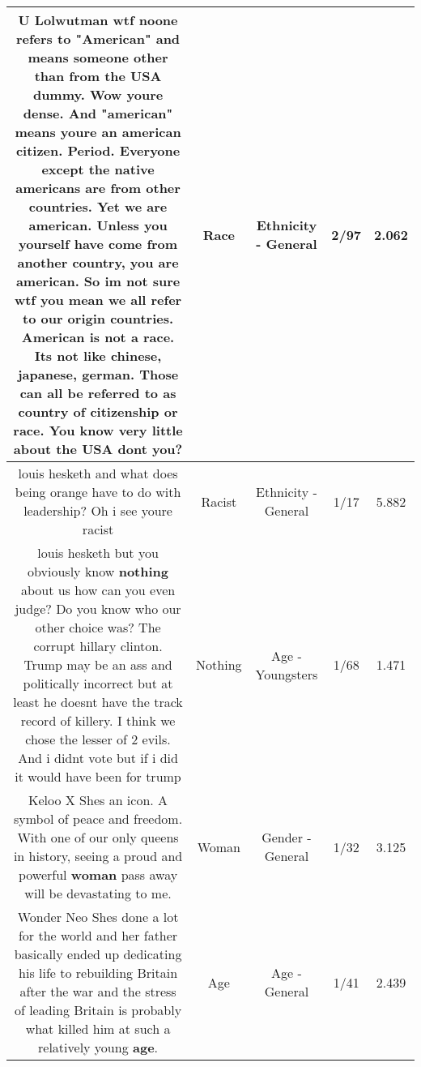 \documentclass[11pt]{article}
\newlength\mylength
\begin{document}
\begin{center}
\begin{longtable}{|C{.65\mylength}|C{.30\mylength}|C{.12\mylength}|C{.12\mylength}|C{.12\mylength}|}
  \small U Lolwutman wtf noone refers to "American" and means someone other than from the USA dummy. Wow youre dense. And "american" means youre an american citizen. Period. Everyone except the native americans are from other countries. Yet we are american. Unless you yourself have come from another country, you are american. So im not sure wtf you mean we all refer to our origin countries. American is not a \textbf{race}. Its not like chinese, japanese, german. Those can all be referred to as country of citizenship or \textbf{race}. You know very little about the USA dont you?\normalsize   & Race & Ethnicity - General & 2/97 & 2.062 \\  \hline
  \small louis hesketh and what does being orange have to do with leadership? Oh i see youre racist\normalsize   & Racist & Ethnicity - General & 1/17 & 5.882 \\  \hline
  \small louis hesketh but you obviously know \textbf{nothing} about us how can you even judge?  Do you know who our other choice was? The corrupt hillary clinton. Trump may be an ass and politically incorrect but at least he doesnt have the track record of killery. I think we chose the lesser of 2 evils. And i didnt vote but if i did it would have been for trump\normalsize   & Nothing & Age - Youngsters & 1/68 & 1.471 \\  \hline
  \small Keloo X Shes an icon. A symbol of peace and freedom. With one of our only queens in history, seeing a proud and powerful \textbf{woman} pass away will be devastating to me.\normalsize   & Woman & Gender - General & 1/32 & 3.125 \\  \hline
  \small Wonder Neo Shes done a lot for the world and her father basically ended up dedicating his life to rebuilding Britain after the war and the stress of leading Britain is probably what killed him at such a relatively young \textbf{age}.\normalsize   & Age & Age - General & 1/41 & 2.439 \\  \hline

\end{longtable}
\end{center}
\end{document}
